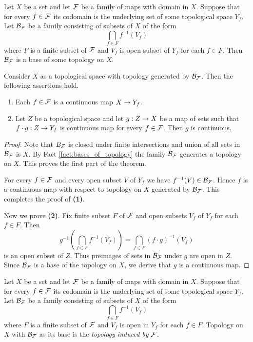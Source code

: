 \begin{theorem}\label{theorem:topology_induced_on_domain_of_a_family_of_maps}
	Let $X$ be a set and let ${\mathcal F}$ be a family of maps with domain in $X$. Suppose that for every $f \in {\mathcal F}$ its codomain is the underlying set of some topological space $Y_f$. Let ${\mathcal B}_{{\mathcal F}}$ be a family consisting of subsets of $X$ of the form
	$$\bigcap_{f\in F}f^{-1}(V_f)$$
	where $F$ is a finite subset of ${\mathcal F}$ and $V_f$ is open subset of $Y_f$ for each $f\in F$. Then ${\mathcal B}_{{\mathcal F}}$ is a base of some topology on $X$.

	Consider $X$ as a topological space with topology generated by ${\mathcal B}_{{\mathcal F}}$. Then the following assertions hold.
	\begin{enumerate}[label=\emph{\textbf{(\arabic*)}}, leftmargin=3.0em]
		\item Each $f \in {\mathcal F}$ is a continuous map $X \rightarrow Y_f$.
		\item Let $Z$ be a topological space and let $g:Z\rightarrow X$ be a map of sets such that $f\cdot g:Z\rightarrow Y_f$ is continuous map for every $f \in {\mathcal F}$. Then $g$ is continuous.
	\end{enumerate}
\end{theorem}
\begin{proof}
	Note that $B_{{\mathcal F}}$ is closed under finite intersections and union of all sets in ${\mathcal B}_{{\mathcal F}}$ is $X$. By Fact \ref{fact:bases_of_topology} the family ${\mathcal B}_{{\mathcal F}}$ generates a topology on $X$. This proves the first part of the theorem.

	For every $f \in {\mathcal F}$ and every open subset $V$ of $Y_f$ we have $f^{-1}(V) \in {\mathcal B}_{{\mathcal F}}$. Hence $f$ is a continuous map with respect to topology on $X$ generated by ${\mathcal B}_{{\mathcal F}}$. This completes the proof of \textbf{(1)}.

	Now we prove \textbf{(2)}. Fix finite subset $F$ of ${\mathcal F}$ and open subsets $V_f$ of $Y_f$ for each $f\in F$. Then
	$$g^{-1}\left(\bigcap_{f\in F}f^{-1}(V_f)\right) = \bigcap_{f \in F}\left(f\cdot g\right)^{-1}(V_f)$$
	is an open subset of $Z$. Thus preimages of sets in ${\mathcal B}_{{\mathcal F}}$ under $g$ are open in $Z$. Since ${\mathcal B}_{{\mathcal F}}$ is a base of the topology on $X$, we derive that $g$ is a continuous map.
\end{proof}

\begin{definition}
	Let $X$ be a set and let ${\mathcal F}$ be a family of maps with domain in $X$. Suppose that for every $f \in {\mathcal F}$ its codomain is the underlying set of some topological space $Y_f$. Let ${\mathcal B}_{{\mathcal F}}$ be a family consisting of subsets of $X$ of the form
	$$\bigcap_{f\in F}f^{-1}(V_f)$$
	where $F$ is a finite subset of ${\mathcal F}$ and $V_f$ is open in $Y_f$ for each $f\in F$. Topology on $X$ with ${\mathcal B}_{{\mathcal F}}$ as its base is the \textit{topology induced by} ${\mathcal F}$.
\end{definition}

